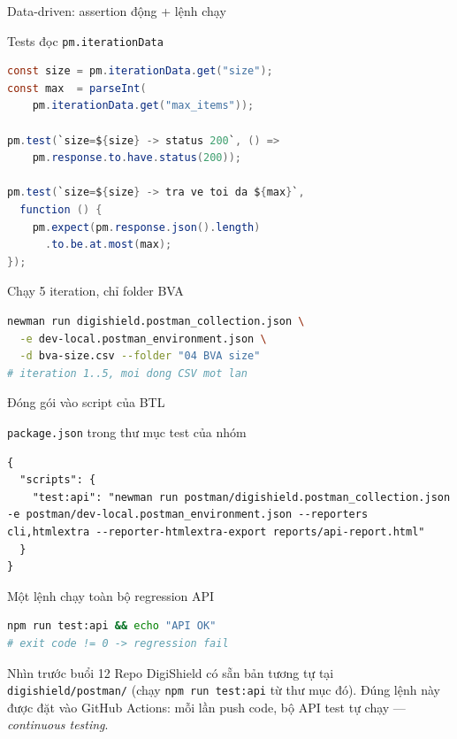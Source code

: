 \documentclass[aspectratio=169,12pt]{beamer}
\begin{document}
\begin{frame}[fragile]{Data-driven: assertion động + lệnh chạy}
  \begin{block}{Tests đọc \texttt{pm.iterationData}}
\begin{lstlisting}[language=Java,basicstyle=\ttfamily\scriptsize]
const size = pm.iterationData.get("size");
const max  = parseInt(
    pm.iterationData.get("max_items"));

pm.test(`size=${size} -> status 200`, () =>
    pm.response.to.have.status(200));

pm.test(`size=${size} -> tra ve toi da ${max}`,
  function () {
    pm.expect(pm.response.json().length)
      .to.be.at.most(max);
});
\end{lstlisting}
  \end{block}

  \begin{block}{Chạy 5 iteration, chỉ folder BVA}
\begin{lstlisting}[language=bash,basicstyle=\ttfamily\scriptsize]
newman run digishield.postman_collection.json \
  -e dev-local.postman_environment.json \
  -d bva-size.csv --folder "04 BVA size"
# iteration 1..5, moi dong CSV mot lan
\end{lstlisting}
  \end{block}
\end{frame}

\begin{frame}[fragile]{Đóng gói vào script của BTL}
  \begin{block}{\texttt{package.json} trong thư mục test của nhóm}
\begin{lstlisting}[language={},basicstyle=\ttfamily\scriptsize]
{
  "scripts": {
    "test:api": "newman run postman/digishield.postman_collection.json -e postman/dev-local.postman_environment.json --reporters cli,htmlextra --reporter-htmlextra-export reports/api-report.html"
  }
}
\end{lstlisting}
  \end{block}

  \begin{block}{Một lệnh chạy toàn bộ regression API}
\begin{lstlisting}[language=bash,basicstyle=\ttfamily\scriptsize]
npm run test:api && echo "API OK"
# exit code != 0 -> regression fail
\end{lstlisting}
  \end{block}

  \begin{exampleblock}{Nhìn trước buổi 12}
    Repo DigiShield có sẵn bản tương tự tại \texttt{digishield/postman/}
    (chạy \texttt{npm run test:api} từ thư mục đó). Đúng lệnh này được đặt
    vào GitHub Actions: mỗi lần push code, bộ API test tự chạy ---
    \emph{continuous testing}.
  \end{exampleblock}
\end{frame}
\end{document}
